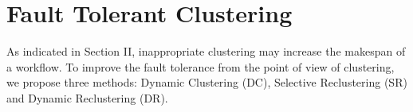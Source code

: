 \documentclass{IOS-Book-Article}
\begin{document}



\section{Fault Tolerant Clustering}

As indicated in Section II, inappropriate clustering may increase the makespan of a workflow. To improve the fault tolerance from the point of view of clustering, we propose three methods: Dynamic Clustering (DC), Selective Reclustering (SR) and Dynamic Reclustering (DR).
\end{document}
